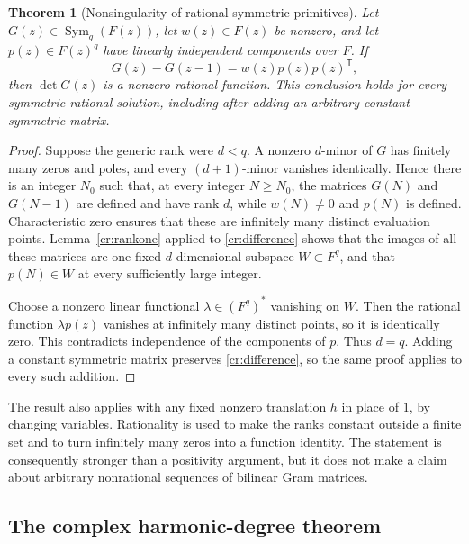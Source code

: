 \documentclass[11pt,a4paper]{article}
\newtheorem{theorem}{Theorem}[section]
\theoremstyle{definition}
\theoremstyle{remark}
\numberwithin{equation}{section}
\begin{document}
\begin{theorem}[Nonsingularity of rational symmetric primitives]
\label{cr:primitive}
Let $G(z)\in\operatorname{Sym}_q(F(z))$, let $w(z)\in F(z)$ be
nonzero, and let $p(z)\in F(z)^q$ have linearly independent
components over $F$.  If
\begin{equation}\label{cr:difference}
 G(z)-G(z-1)=w(z)p(z)p(z)^{\mathsf T},
\end{equation}
then $\det G(z)$ is a nonzero rational function.  This conclusion
holds for every symmetric rational solution, including after adding
an arbitrary constant symmetric matrix.
\end{theorem}
\begin{proof}
Suppose the generic rank were $d<q$.  A nonzero $d$-minor of $G$
has finitely many zeros and poles, and every $(d+1)$-minor vanishes
identically.  Hence there is an integer $N_0$ such that, at every
integer $N\ge N_0$, the matrices $G(N)$ and $G(N-1)$ are defined
and have rank $d$, while $w(N)\ne0$ and $p(N)$ is defined.
Characteristic zero ensures that these are infinitely many distinct
evaluation points.  Lemma~\ref{cr:rankone} applied to
\eqref{cr:difference} shows that the images of all these matrices
are one fixed $d$-dimensional subspace $W\subset F^q$, and that
$p(N)\in W$ at every sufficiently large integer.

Choose a nonzero linear functional $\lambda\in(F^q)^*$ vanishing
on $W$.  Then the rational function $\lambda p(z)$ vanishes at
infinitely many distinct points, so it is identically zero.  This
contradicts independence of the components of $p$.  Thus $d=q$.
Adding a constant symmetric matrix preserves \eqref{cr:difference},
so the same proof applies to every such addition.
\end{proof}

The result also applies with any fixed nonzero translation $h$ in
place of $1$, by changing variables.  Rationality is used to make
the ranks constant outside a finite set and to turn infinitely many
zeros into a function identity.  The statement is consequently stronger
than a positivity argument, but it does not make a claim about arbitrary
nonrational sequences of bilinear Gram matrices.

\subsection{The complex harmonic-degree theorem}
\end{document}

